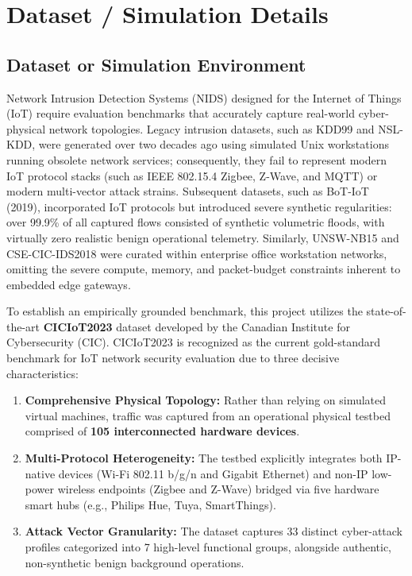 \documentclass[12pt,a4paper]{report}
\begin{document}

\setcounter{chapter}{2}

\chapter{Dataset / Simulation Details}

\section{Dataset or Simulation Environment}
Network Intrusion Detection Systems (NIDS) designed for the Internet of Things (IoT) require evaluation benchmarks that accurately capture real-world cyber-physical network topologies. Legacy intrusion datasets, such as KDD99 and NSL-KDD, were generated over two decades ago using simulated Unix workstations running obsolete network services; consequently, they fail to represent modern IoT protocol stacks (such as IEEE 802.15.4 Zigbee, Z-Wave, and MQTT) or modern multi-vector attack strains. Subsequent datasets, such as BoT-IoT (2019), incorporated IoT protocols but introduced severe synthetic regularities: over 99.9\% of all captured flows consisted of synthetic volumetric floods, with virtually zero realistic benign operational telemetry. Similarly, UNSW-NB15 and CSE-CIC-IDS2018 were curated within enterprise office workstation networks, omitting the severe compute, memory, and packet-budget constraints inherent to embedded edge gateways.

To establish an empirically grounded benchmark, this project utilizes the state-of-the-art \textbf{CICIoT2023} dataset developed by the Canadian Institute for Cybersecurity (CIC). CICIoT2023 is recognized as the current gold-standard benchmark for IoT network security evaluation due to three decisive characteristics:
\begin{enumerate}
    \item \textbf{Comprehensive Physical Topology:} Rather than relying on simulated virtual machines, traffic was captured from an operational physical testbed comprised of \textbf{105 interconnected hardware devices}.
    \item \textbf{Multi-Protocol Heterogeneity:} The testbed explicitly integrates both IP-native devices (Wi-Fi 802.11 b/g/n and Gigabit Ethernet) and non-IP low-power wireless endpoints (Zigbee and Z-Wave) bridged via five hardware smart hubs (e.g., Philips Hue, Tuya, SmartThings).
    \item \textbf{Attack Vector Granularity:} The dataset captures 33 distinct cyber-attack profiles categorized into 7 high-level functional groups, alongside authentic, non-synthetic benign background operations.
\end{enumerate}
\end{document}
